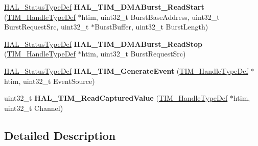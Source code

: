 \begin{DoxyCompactItemize}
\mbox{\hyperlink{stm32f4xx__hal__def_8h_a63c0679d1cb8b8c684fbb0632743478f}{H\+A\+L\+\_\+\+Status\+Type\+Def}} {\bfseries H\+A\+L\+\_\+\+T\+I\+M\+\_\+\+D\+M\+A\+Burst\+\_\+\+Read\+Start} (\mbox{\hyperlink{struct_t_i_m___handle_type_def}{T\+I\+M\+\_\+\+Handle\+Type\+Def}} $\ast$htim, uint32\+\_\+t Burst\+Base\+Address, uint32\+\_\+t Burst\+Request\+Src, uint32\+\_\+t $\ast$Burst\+Buffer, uint32\+\_\+t Burst\+Length)
\item 
\mbox{\label{group___t_i_m___exported___functions___group8_ga41cfa290ee87229cba1962e78e2a9d01}} 
\mbox{\hyperlink{stm32f4xx__hal__def_8h_a63c0679d1cb8b8c684fbb0632743478f}{H\+A\+L\+\_\+\+Status\+Type\+Def}} {\bfseries H\+A\+L\+\_\+\+T\+I\+M\+\_\+\+D\+M\+A\+Burst\+\_\+\+Read\+Stop} (\mbox{\hyperlink{struct_t_i_m___handle_type_def}{T\+I\+M\+\_\+\+Handle\+Type\+Def}} $\ast$htim, uint32\+\_\+t Burst\+Request\+Src)
\item 
\mbox{\label{group___t_i_m___exported___functions___group8_gab4a60fe7cbb64a321bdce2ee1b9c8730}} 
\mbox{\hyperlink{stm32f4xx__hal__def_8h_a63c0679d1cb8b8c684fbb0632743478f}{H\+A\+L\+\_\+\+Status\+Type\+Def}} {\bfseries H\+A\+L\+\_\+\+T\+I\+M\+\_\+\+Generate\+Event} (\mbox{\hyperlink{struct_t_i_m___handle_type_def}{T\+I\+M\+\_\+\+Handle\+Type\+Def}} $\ast$htim, uint32\+\_\+t Event\+Source)
\item 
\mbox{\label{group___t_i_m___exported___functions___group8_ga6528480e73e4e51d5ce8aaca00d64d13}} 
uint32\+\_\+t {\bfseries H\+A\+L\+\_\+\+T\+I\+M\+\_\+\+Read\+Captured\+Value} (\mbox{\hyperlink{struct_t_i_m___handle_type_def}{T\+I\+M\+\_\+\+Handle\+Type\+Def}} $\ast$htim, uint32\+\_\+t Channel)
\end{DoxyCompactItemize}


\subsection{Detailed Description}
